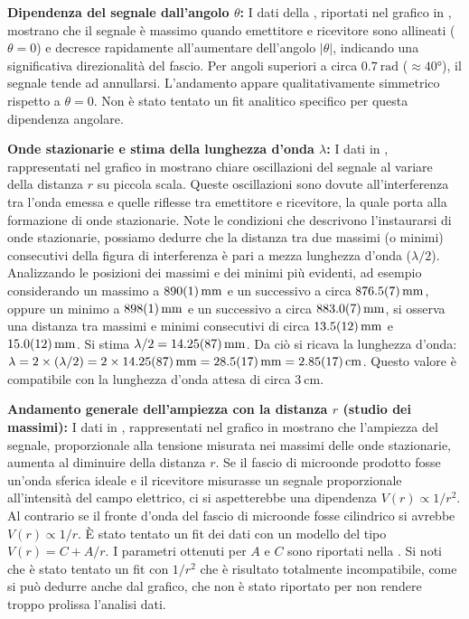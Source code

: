 \documentclass[a4paper]{article}
\begin{document}
\textbf{Dipendenza del segnale dall'angolo $\theta$:}
I dati della , riportati nel grafico in , mostrano che il segnale è massimo quando emettitore e ricevitore sono allineati ($\theta=0$) e decresce rapidamente all'aumentare dell'angolo $|\theta|$, indicando una significativa direzionalità del fascio. Per angoli superiori a circa $\SI{0.7}{\radian}$ ($\approx \ang{40}$), il segnale tende ad annullarsi. L'andamento appare qualitativamente simmetrico rispetto a $\theta=0$. Non è stato tentato un fit analitico specifico per questa dipendenza angolare.

\textbf{Onde stazionarie e stima della lunghezza d'onda $\lambda$:}
I dati in , rappresentati nel grafico in  mostrano chiare oscillazioni del segnale al variare della distanza $r$ su piccola scala. Queste oscillazioni sono dovute all'interferenza tra l'onda emessa e quelle riflesse tra emettitore e ricevitore, la quale porta alla formazione di onde stazionarie. Note le condizioni che descrivono l'instaurarsi di onde stazionarie, possiamo dedurre che la distanza tra due massimi (o minimi) consecutivi della figura di interferenza è pari a mezza lunghezza d'onda ($\lambda/2$).
Analizzando le posizioni dei massimi e dei minimi più evidenti, ad esempio considerando un massimo a $\SI{890 \pm 1}{\milli\metre}$ e un successivo a circa $\SI{876.5 \pm 0.7}{\milli\metre}$, oppure un minimo a $\SI{898 \pm 1}{\milli\metre}$ e un successivo a circa $\SI{883 \pm 0.7}{\milli\metre}$, si osserva una distanza tra massimi e minimi consecutivi di circa $\SI{13.5 \pm 1.2}{\milli\metre}$ e $\SI{15 \pm 1.2}{\milli\metre}$. Si stima $\lambda/2 = \SI{14.25 \pm 0.87}{\milli\metre}$.
Da ciò si ricava la lunghezza d'onda:
$\lambda = 2 \times (\lambda/2) = 2 \times \SI{14.25 \pm 0.87}{\milli\metre} = \SI{28.5 \pm 1.7}{\milli\metre} = \SI{2.85 \pm 0.17}{\centi\metre}$.
Questo valore è compatibile con la lunghezza d'onda attesa di circa $\SI{3}{\centi\metre}$.

\textbf{Andamento generale dell'ampiezza con la distanza $r$ (studio dei massimi):}
I dati in , rappresentati nel grafico in  mostrano che l'ampiezza del segnale, proporzionale alla tensione misurata nei massimi delle onde stazionarie, aumenta al diminuire della distanza $r$. Se il fascio di microonde prodotto fosse un'onda sferica ideale e il ricevitore misurasse un segnale proporzionale all'intensità del campo elettrico, ci si aspetterebbe una dipendenza $V(r) \propto 1/r^2$. Al contrario se il fronte d'onda del fascio di microonde fosse cilindrico si avrebbe $V(r) \propto 1/r$.
È stato tentato un fit dei dati con un modello del tipo $V(r) = C + A/r$. I parametri ottenuti per $A$ e $C$ sono riportati nella . Si noti che è stato tentato un fit con $1/r^2$ che è risultato totalmente incompatibile, come si può dedurre anche dal grafico, che non è stato riportato per non rendere troppo prolissa l'analisi dati.
\end{document}
